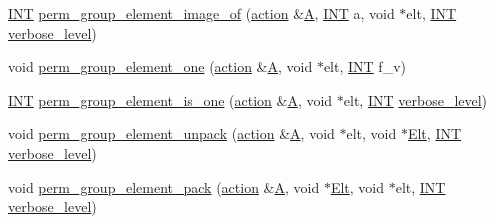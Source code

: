 \begin{DoxyCompactItemize}
\item 
\mbox{\hyperlink{galois_8h_a09fddde158a3a20bd2dcadb609de11dc}{I\+NT}} \mbox{\hyperlink{interface__perm__group_8_c_a92c32b2728749c0abc53100001ee01b3}{perm\+\_\+group\+\_\+element\+\_\+image\+\_\+of}} (\mbox{\hyperlink{classaction}{action}} \&\mbox{\hyperlink{simeon_8_c_a97833f04c3a9c008df5521a2fc291bb4}{A}}, \mbox{\hyperlink{galois_8h_a09fddde158a3a20bd2dcadb609de11dc}{I\+NT}} a, void $\ast$elt, \mbox{\hyperlink{galois_8h_a09fddde158a3a20bd2dcadb609de11dc}{I\+NT}} \mbox{\hyperlink{simeon_8_c_a818073fbcc2f439e7c56952f67386122}{verbose\+\_\+level}})
\item 
void \mbox{\hyperlink{interface__perm__group_8_c_a5bb0c6025f20eb83dcecd116e209d26c}{perm\+\_\+group\+\_\+element\+\_\+one}} (\mbox{\hyperlink{classaction}{action}} \&\mbox{\hyperlink{simeon_8_c_a97833f04c3a9c008df5521a2fc291bb4}{A}}, void $\ast$elt, \mbox{\hyperlink{galois_8h_a09fddde158a3a20bd2dcadb609de11dc}{I\+NT}} f\+\_\+v)
\item 
\mbox{\hyperlink{galois_8h_a09fddde158a3a20bd2dcadb609de11dc}{I\+NT}} \mbox{\hyperlink{interface__perm__group_8_c_a75575c5c43a90cd7937adc817f1e2200}{perm\+\_\+group\+\_\+element\+\_\+is\+\_\+one}} (\mbox{\hyperlink{classaction}{action}} \&\mbox{\hyperlink{simeon_8_c_a97833f04c3a9c008df5521a2fc291bb4}{A}}, void $\ast$elt, \mbox{\hyperlink{galois_8h_a09fddde158a3a20bd2dcadb609de11dc}{I\+NT}} \mbox{\hyperlink{simeon_8_c_a818073fbcc2f439e7c56952f67386122}{verbose\+\_\+level}})
\item 
void \mbox{\hyperlink{interface__perm__group_8_c_a71b6c0fd24b3d4880ec2f1c0f4ed5677}{perm\+\_\+group\+\_\+element\+\_\+unpack}} (\mbox{\hyperlink{classaction}{action}} \&\mbox{\hyperlink{simeon_8_c_a97833f04c3a9c008df5521a2fc291bb4}{A}}, void $\ast$elt, void $\ast$\mbox{\hyperlink{simeon_8_c_aec1406935bdb1fee3561fcb840964100}{Elt}}, \mbox{\hyperlink{galois_8h_a09fddde158a3a20bd2dcadb609de11dc}{I\+NT}} \mbox{\hyperlink{simeon_8_c_a818073fbcc2f439e7c56952f67386122}{verbose\+\_\+level}})
\item 
void \mbox{\hyperlink{interface__perm__group_8_c_a47c395f2f5a8a55991da2cbe18845a2f}{perm\+\_\+group\+\_\+element\+\_\+pack}} (\mbox{\hyperlink{classaction}{action}} \&\mbox{\hyperlink{simeon_8_c_a97833f04c3a9c008df5521a2fc291bb4}{A}}, void $\ast$\mbox{\hyperlink{simeon_8_c_aec1406935bdb1fee3561fcb840964100}{Elt}}, void $\ast$elt, \mbox{\hyperlink{galois_8h_a09fddde158a3a20bd2dcadb609de11dc}{I\+NT}} \mbox{\hyperlink{simeon_8_c_a818073fbcc2f439e7c56952f67386122}{verbose\+\_\+level}})

\end{DoxyCompactItemize}
